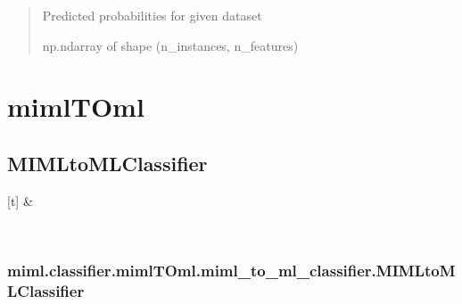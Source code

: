 \documentclass[letterpaper,10pt,english]{sphinxmanual}
\begin{document}
\begin{fulllineitems}
\begin{fulllineitems}
\begin{quote}
\begin{description}
\sphinxAtStartPar
{} \textendash{} Predicted probabilities for given dataset

\sphinxAtStartPar
np.ndarray of shape (n\_instances, n\_features)

\end{description}\end{quote}

\end{fulllineitems}


\end{fulllineitems}


\sphinxstepscope


\section{mimlTOml}
\label{\detokenize{classifier/mimlTOml/index:mimltoml}}\label{\detokenize{classifier/mimlTOml/index::doc}}
\sphinxstepscope


\subsection{MIMLtoMLClassifier}
\label{\detokenize{classifier/mimlTOml/miml_to_ml_classifier:mimltomlclassifier}}\label{\detokenize{classifier/mimlTOml/miml_to_ml_classifier::doc}}

\begin{savenotes}\sphinxattablestart
\sphinxthistablewithglobalstyle
\sphinxthistablewithnovlinesstyle
\centering
\begin{tabulary}{\linewidth}[t]{}
\sphinxtoprule
\sphinxtableatstartofbodyhook
\sphinxAtStartPar
{\hyperref[\detokenize{classifier/mimlTOml/_autosummary/miml.classifier.mimlTOml.miml_to_ml_classifier.MIMLtoMLClassifier:miml.classifier.mimlTOml.miml_to_ml_classifier.MIMLtoMLClassifier}]{}}
&
\sphinxAtStartPar

\\
\sphinxbottomrule
\end{tabulary}
\sphinxtableafterendhook\par
\sphinxattableend\end{savenotes}

\sphinxstepscope


\subsubsection{miml.classifier.mimlTOml.miml\_to\_ml\_classifier.MIMLtoMLClassifier}
\label{\detokenize{classifier/mimlTOml/_autosummary/miml.classifier.mimlTOml.miml_to_ml_classifier.MIMLtoMLClassifier:miml-classifier-mimltoml-miml-to-ml-classifier-mimltomlclassifier}}\label{\detokenize{classifier/mimlTOml/_autosummary/miml.classifier.mimlTOml.miml_to_ml_classifier.MIMLtoMLClassifier::doc}}
\end{document}
